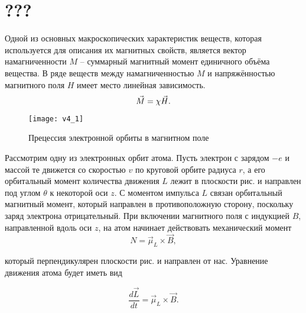 
\section{???}
Одной из основных макроскопических характеристик веществ, которая используется для описания их магнитных свойств, является вектор намагниченности $M$ -- суммарный магнитный момент единичного объёма вещества. В ряде веществ между намагниченностью $M$ и напряжённостью магнитного поля $H$ имеет место линейная зависимость.
\begin{equation}
	\eqmark{magnetization-magnetic vector}
	\vec{M} = \chi\vec{H}.
\end{equation}

\begin{wrapfigure}[24]{r}{0.35\textwidth}
	\texttt{[image: v4\_1]}
	\caption{Прецессия электронной орбиты в магнитном поле}
\end{wrapfigure}

Рассмотрим одну из электронных орбит атома. Пусть электрон с зарядом $-e$ и массой те движется со скоростью $v$ по круговой орбите радиуса $r$, а его орбитальный момент количества движения $L$ лежит в плоскости рис.  и направлен под углом $\theta$ к некоторой оси $z$. С моментом импульса $L$ связан орбитальный магнитный момент, который направлен в противоположную сторону, поскольку заряд электрона отрицательный. При включении магнитного поля с индукцией $B$, направленной вдоль оси $z$, на атом начинает действовать механический момент
\begin{equation*}
	N = \vec{\mu}_L\times \vec{B},
\end{equation*}

который перпендикулярен плоскости рис.  и направлен от нас. Уравнение движения атома будет иметь вид

\begin{equation*}
	\frac{d\vec{L}}{dt} = \vec{\mu}_L\times \vec{B}.
\end{equation*}

